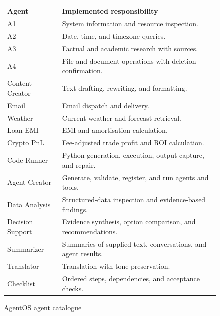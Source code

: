 \begin{figure}[H]
\centering
\begingroup
\small
\setlength{\tabcolsep}{4pt}
\renewcommand{\arraystretch}{1.0}
\begin{tabularx}{\textwidth}{|>{\centering\arraybackslash}p{}|>{\raggedright\arraybackslash}X|}
\hline
\textbf{Agent} & \textbf{Implemented responsibility} \\ \hline
A1 & System information and resource inspection. \\ \hline
A2 & Date, time, and timezone queries. \\ \hline
A3 & Factual and academic research with sources. \\ \hline
A4 & File and document operations with deletion confirmation. \\ \hline
Content Creator & Text drafting, rewriting, and formatting. \\ \hline
Email & Email dispatch and delivery. \\ \hline
Weather & Current weather and forecast retrieval. \\ \hline
Loan EMI & EMI and amortisation calculation. \\ \hline
Crypto PnL & Fee-adjusted trade profit and ROI calculation. \\ \hline
Code Runner & Python generation, execution, output capture, and repair. \\ \hline
Agent Creator & Generate, validate, register, and run agents and tools. \\ \hline
Data Analysis & Structured-data inspection and evidence-based findings. \\ \hline
Decision Support & Evidence synthesis, option comparison, and recommendations. \\ \hline
Summarizer & Summaries of supplied text, conversations, and agent results. \\ \hline
Translator & Translation with tone preservation. \\ \hline
Checklist & Ordered steps, dependencies, and acceptance checks. \\ \hline
\end{tabularx}
\endgroup
\caption{AgentOS agent catalogue}
\label{fig:agent-catalogue}
\end{figure}

